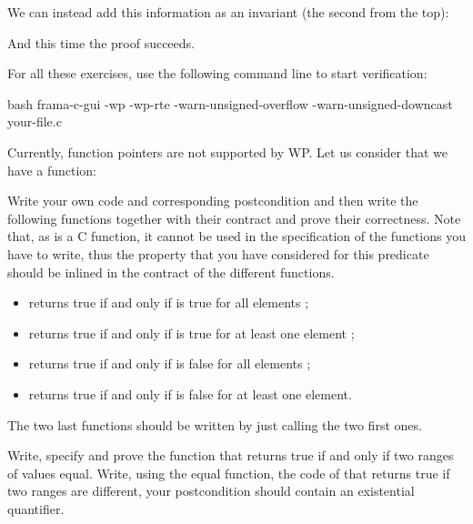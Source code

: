 We can instead add this information as an invariant (the second from
the top):




And this time the proof succeeds.




For all these exercises, use the following command line to start verification:

\begin{CodeBlock}{bash}
frama-c-gui -wp -wp-rte -warn-unsigned-overflow -warn-unsigned-downcast your-file.c
\end{CodeBlock}




Currently, function pointers are not supported by WP. Let us consider that
we have a function:




Write your own code and corresponding postcondition and then write the
following functions together with their contract and prove their correctness.
Note that, as  is a C function, it cannot be used in the
specification of the functions you have to write, thus the property that you
have considered for this predicate should be inlined in the contract of the
different functions.


\begin{itemize}
\item {} returns true if and only if 
  is true for all elements ;
\item {} returns true if and only if 
  is true for at least one element ;
\item {} returns true if and only if 
  is false for all elements ;
\item {} returns true if and only if 
  is false for at least one element.
\end{itemize}


The two last functions should be written by just calling the two first ones.






Write, specify and prove the function  that returns true if
and only if two ranges of values equal. Write, using the equal function, the
code of  that returns true if two ranges are different,
your postcondition should contain an existential quantifier.


